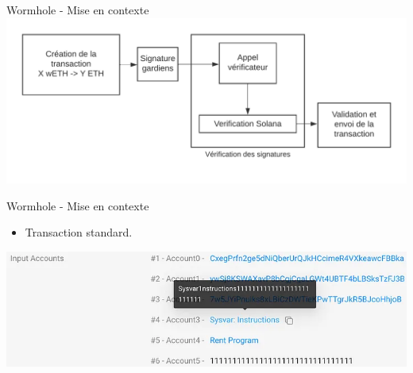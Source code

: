 \begin{frame}{Wormhole - Mise en contexte}
    \centering
    \includegraphics[scale = 0.69]{centralisation/img/wormhole/worm_fonc.png}
\end{frame}

\begin{frame}{Wormhole - Mise en contexte}
    \begin{itemize}
        \item Transaction standard.
    \end{itemize}
        \centering
        \includegraphics[scale = 0.45]{centralisation/img/wormhole/sysvar_trans_normal.png}
\end{frame}

